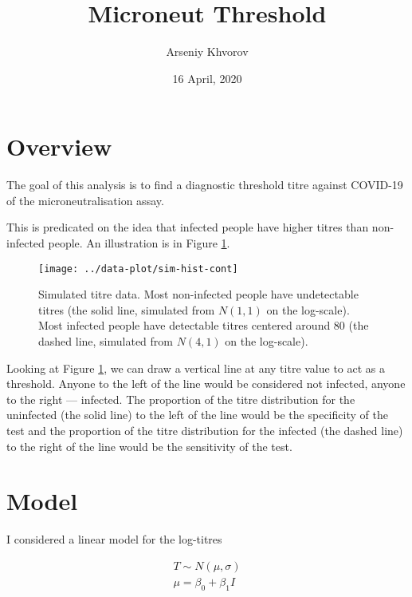 \documentclass[]{article}
\title{Microneut Threshold}
\author{Arseniy Khvorov}
\date{16 April, 2020}
\begin{document}
\maketitle

\section{Overview}\label{overview}

The goal of this analysis is to find a diagnostic threshold titre
against COVID-19 of the microneutralisation assay.

This is predicated on the idea that infected people have higher titres
than non-infected people. An illustration is in Figure
\ref{fig:sim-hist-cont}.






\begin{figure}

{\centering \texttt{[image: ../data-plot/sim-hist-cont]} 

}

\caption{Simulated titre data. Most non-infected people have
undetectable titres (the solid line, simulated from \(N(1, 1)\) on the
log-scale). Most infected people have detectable titres centered around
80 (the dashed line, simulated from \(N(4, 1)\) on the log-scale).}\label{fig:sim-hist-cont}
\end{figure}

Looking at Figure \ref{fig:sim-hist-cont}, we can draw a vertical line
at any titre value to act as a threshold. Anyone to the left of the line
would be considered not infected, anyone to the right --- infected. The
proportion of the titre distribution for the uninfected (the solid line)
to the left of the line would be the specificity of the test and the
proportion of the titre distribution for the infected (the dashed line)
to the right of the line would be the sensitivity of the test.

\section{Model}\label{model}

I considered a linear model for the log-titres

\begin{gather*}
T \sim N(\mu, \sigma) \\
\mu = \beta_0 + \beta_1 I
\end{gather*}
\end{document}
